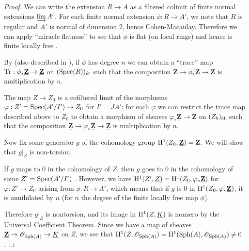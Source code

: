 \documentclass[12pt]{article}
\renewcommand{\O}{\mathscr{O}}
\newcommand{\Z}{\mathbf{Z}}
\newcommand{\spec}{{\rm Spec}}
\newcommand{\sph}{{\rm Sph}}
\newcommand{\et}{{\rm\acute{e}t}}
\renewcommand{\H}{{\rm H}}
\newcommand{\spcite}[2]{\cite[\href{https://stacks.math.columbia.edu/tag/#1}{{#2} {#1}}]{stackp}}
\theoremstyle{definition}
\numberwithin{equation}{subsection}
\begin{document}
\begin{proof}
We can write the extension $R \to A$ as a filtered colimit of finite normal extensions $\varinjlim A'$. For each finite normal extension $\phi: R \to A'$, we note that $R$ is regular \cite[Corollary 7.7]{greco69} and $A'$ is normal of dimension $2$, hence Cohen-Macaulay. Therefore we can apply ``miracle flatness'' \cite[Theorem 23.1]{matscrt} to see that $\phi$ is flat (on local rings) and hence is finite locally free \cite[Theorem 7.10]{matscrt}. 

By \cite[Expos\'{e} XVII, Prop. 6.2.5]{sga4} (also described in \spcite{0GKE}{Section}), if $\phi$ has degree $n$  we can obtain a ``trace'' map ${\rm Tr}: \phi_*\underline{\Z} \to \underline{\Z}$ on $(\spec(R))_\et$ such that the composition $\underline{\Z} \to \phi_*\underline{\Z} \to \underline{\Z}$ is multiplication by $n$.  

The map $Z \to Z_0$ is a cofiltered limit of the morphisms $\varphi: Z'=\spec(A'/I') \to Z_0$ for $I'=JA'$; for each $\varphi$ we can restrict the trace map described above to $Z_0$ to obtain a morphism of sheaves $\varphi_* \underline{\Z} \to \underline{\Z}$ on $(Z_0)_\et$ such that the composition $\underline{\Z} \to \varphi_*\underline{\Z} \to \underline{\Z}$ is multiplication by $n$. 

Now fix some generator $g$ of the cohomology group $\H^1(Z_0,\underline{\Z})=\Z$. We will show that $g|_Z$ is non-torsion. 

If $g$ maps to $0$ in the cohomology of $Z$, then $g$ goes to $0$ in the cohomology of some $Z'=\spec(A'/I')$ \spcite{09YP}{Lemma}. However, we have $\H^1(Z',\underline{Z})=\H^1(Z_0, \varphi_*\underline{\Z})$ for $\varphi: Z' \to Z_0$ arising from $\phi: R \to A'$, which means that if $g$ is $0$ in $\H^1(Z_0, \varphi_*\underline{\Z})$, it is annihilated by $n$ (for $n$ the degree of the finite locally free map $\phi$). 

Therefore $g|_Z$ is nontorsion, and its image in $\H^1(Z,\underline{K})$ is nonzero by the Universal Coefficient Theorem. Since we have a map of sheaves $\underline{\Z} \to \O_{\sph(A)} \to \underline{K}$ on $Z$, we see that $\H^1(Z,\O_{\sph(A)})=\H^1(\sph(A),\O_{\sph(A)}) \ne 0$. \end{proof}

\end{document}
